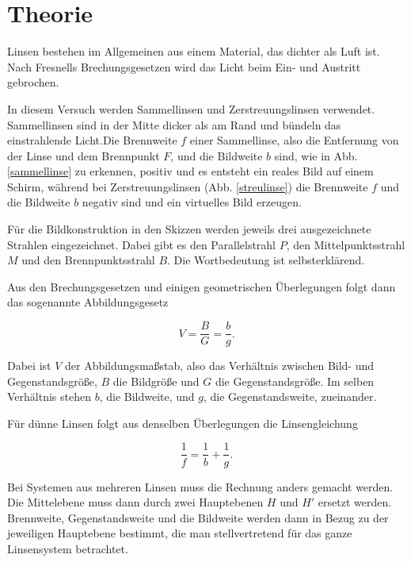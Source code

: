 \section{Theorie}
\label{sec:Theorie}

Linsen bestehen im Allgemeinen aus einem Material, das dichter als Luft ist.
Nach Fresnells Brechungsgesetzen wird das Licht beim Ein- und Austritt gebrochen.

In diesem Versuch werden Sammellinsen und Zerstreuungslinsen verwendet. Sammellinsen sind in der Mitte dicker als am Rand und bündeln das einstrahlende Licht.Die Brennweite $f$ einer Sammellinse, also die Entfernung von der Linse und dem Brennpunkt $F$, und die Bildweite $b$ sind, wie in Abb. \ref{sammellinse} zu erkennen, positiv und es entsteht ein reales Bild auf einem Schirm, während bei Zerstreuungslinsen (Abb. \ref{streulinse}) die Brennweite $f$ und die Bildweite $b$ negativ sind und ein virtuelles Bild erzeugen.  

Für die Bildkonstruktion in den Skizzen werden jeweils drei ausgezeichnete Strahlen eingezeichnet. Dabei gibt es den Parallelstrahl $P$, den Mittelpunktsstrahl $M$ und den Brennpunktsstrahl $B$. Die Wortbedeutung ist selbsterklärend.

Aus den Brechungsgesetzen und einigen geometrischen Überlegungen folgt dann das sogenannte Abbildungsgesetz

\begin{equation}
    V = \frac{B}{G} = \frac{b}{g}.
    \label{eqn:abbildungsgesetz}
\end{equation}

Dabei ist $V$ der Abbildungsmaßstab, also das Verhältnis zwischen Bild- und Gegenstandsgröße, $B$ die Bildgröße und $G$ die Gegenstandsgröße. Im selben Verhältnis stehen $b$, die Bildweite, und $g$, die Gegenstandsweite, zueinander. 

Für dünne Linsen folgt aus denselben Überlegungen die Linsengleichung 

\begin{equation}
    \frac{1}{f}= \frac{1}{b} + \frac{1}{g}.
    \label{eqn:linsengleichung}
\end{equation}

Bei Systemen aus mehreren Linsen muss die Rechnung anders gemacht werden. 
Die Mittelebene muss dann durch zwei Hauptebenen $H$ und $H'$ ersetzt werden.
Brennweite, Gegenstandsweite und die Bildweite werden dann in Bezug zu der jeweiligen Hauptebene bestimmt, die man stellvertretend für das ganze Linsensystem betrachtet. 

